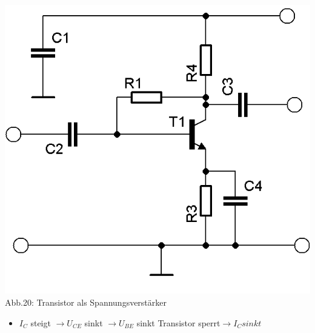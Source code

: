\begin{frame}
	\begin{center}
		\includegraphics[scale=1.2]{a06/Transistor-Verstaerker-APstab2a.png}\\
		Abb.20: Transistor als Spannungsverstärker \cite{bnetza}
	\end{center}
	\begin{itemize}
		\item	$I_C$ steigt $\rightarrow U_{CE}$ sinkt $\rightarrow U_{BE}$ sinkt Transistor sperrt$ \rightarrow I_C sinkt$
	\end{itemize}
\end{frame}

